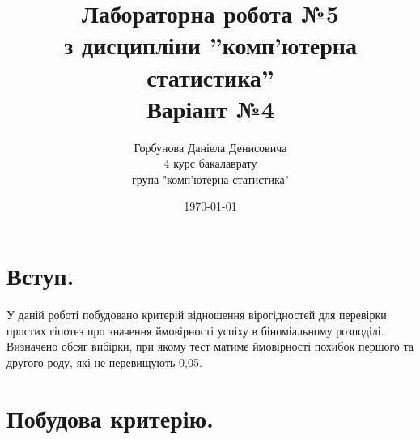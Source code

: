\documentclass[12pt]{article}
\title{Лабораторна робота №5\\ з дисципліни ''комп'ютерна статистика''\\Варіант №4}
\author{
        Горбунова Даніела Денисовича\\
        4 курс бакалаврату\\
        група "комп'ютерна статистика"
}
\date{\today}
\begin{document}
\maketitle

\section{Вступ.}

У даній роботі побудовано критерій відношення вірогідностей для перевірки простих гіпотез про значення ймовірності успіху в біноміальному розподілі. Визначено обсяг вибірки, при якому тест матиме ймовірності похибок першого та другого роду, які не перевищують 0,05.

\section{Побудова критерію.}
\end{document}
